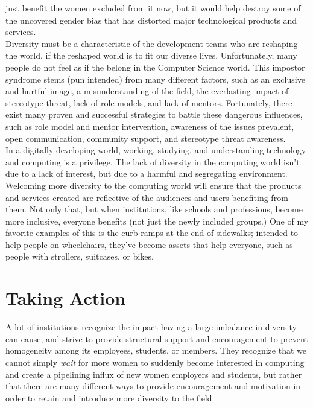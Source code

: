 \documentclass[12pt]{article}
\begin{document}
just benefit the women excluded from it now, but it would help destroy some of the uncovered gender bias that has distorted major technological products and services. \\
	
	
	Diversity must be a characteristic of the development teams who are reshaping the world, if the reshaped world is to fit our diverse lives. Unfortunately, many people do not feel as if the belong in the Computer Science world. This impostor syndrome stems (pun intended) from many different factors, such as an exclusive and hurtful image, a misunderstanding of the field, the everlasting impact of stereotype threat, lack of role models, and lack of mentors. Fortunately, there exist many proven and successful strategies to battle these dangerous influences, such as role model and mentor intervention, awareness of the issues prevalent, open communication, community support, and stereotype threat awareness. \\
	
	In a digitally developing world, working, studying, and understanding technology and computing is a privilege. The lack of diversity in the computing world isn't due to a lack of interest, but due to a harmful and segregating environment. Welcoming more diversity to the computing world will ensure that the products and services created are reflective of the audiences and users benefiting from them. Not only that, but when institutions, like schools and professions, become more inclusive, everyone benefits (not just the newly included groups.) One of my favorite examples of this is the curb ramps at the end of sidewalks; intended to help people on wheelchairs, they've become assets that help everyone, such as people with strollers, suitcases, or bikes.  \\
	\pagebreak
	
	\section{Taking Action}
	
	A lot of institutions recognize the impact having a large imbalance in diversity can cause, and strive to provide structural support and encouragement to prevent homogeneity among its employees, students, or members. They recognize that we cannot simply \textit{wait} for more women to suddenly become interested in computing and create a pipelining influx of new women employers and students, but rather that there are many different ways to provide encouragement and motivation in order to retain and introduce more diversity to the field.\\
	
\end{document}
